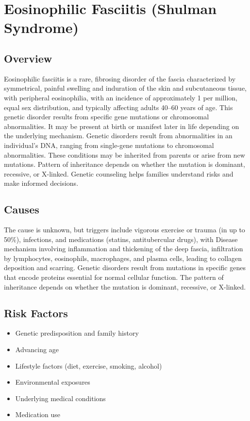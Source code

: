 \chapter{Eosinophilic Fasciitis (Shulman Syndrome)}
\label{sec:Eosinophilic Fasciitis (Shulman Syndrome)}

\section{Overview}
Eosinophilic fasciitis is a rare, fibrosing disorder of the fascia characterized by symmetrical, painful swelling and induration of the skin and subcutaneous tissue, with peripheral eosinophilia, with an incidence of approximately 1 per million, equal sex distribution, and typically affecting adults 40--60 years of age. This genetic disorder results from specific gene mutations or chromosomal abnormalities. It may be present at birth or manifest later in life depending on the underlying mechanism. Genetic disorders result from abnormalities in an individual's DNA, ranging from single-gene mutations to chromosomal abnormalities. These conditions may be inherited from parents or arise from new mutations. Pattern of inheritance depends on whether the mutation is dominant, recessive, or X-linked. Genetic counseling helps families understand risks and make informed decisions.
\section{Causes}
The cause is unknown, but triggers include vigorous exercise or trauma (in up to 50\%), infections, and medications (statins, antitubercular drugs), with Disease mechanism involving inflammation and thickening of the deep fascia, infiltration by lymphocytes, eosinophils, macrophages, and plasma cells, leading to collagen deposition and scarring. Genetic disorders result from mutations in specific genes that encode proteins essential for normal cellular function. The pattern of inheritance depends on whether the mutation is dominant, recessive, or X-linked.   
\section{Risk Factors}

\begin{itemize}[noitemsep]
  \item Genetic predisposition and family history
  \item Advancing age
  \item Lifestyle factors (diet, exercise, smoking, alcohol)
  \item Environmental exposures
  \item Underlying medical conditions
  \item Medication use
\end{itemize}
